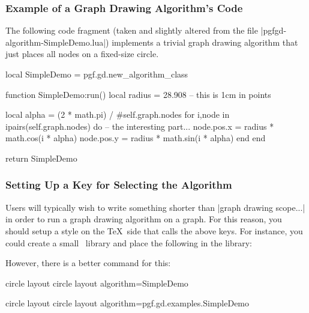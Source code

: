 \subsubsection{Example of a Graph Drawing Algorithm's Code}

The following code fragment (taken and slightly altered
from the file |pgfgd-algorithm-SimpleDemo.lua|)
implements a trivial graph drawing algorithm that just places all
nodes on a fixed-size circle.  



\begin{codeexample}
local SimpleDemo = pgf.gd.new_algorithm_class {}

function SimpleDemo:run()
  local radius = 28.908  -- this is 1cm in points

  local alpha = (2 * math.pi) / #self.graph.nodes
  for i,node in ipairs(self.graph.nodes) do
    -- the interesting part...
    node.pos.x = radius * math.cos(i * alpha)
    node.pos.y = radius * math.sin(i * alpha)
  end
end

return SimpleDemo
\end{codeexample}


\subsubsection{Setting Up a Key for Selecting the Algorithm}

Users will typically wish to write something shorter than
|graph drawing scope...| in order to run a graph drawing algorithm on
a graph. For this reason, you should setup a style on the \TeX\ side
that calls the above keys. For instance, you could create a small
\tikzname\ library and place the following in the library:

\begin{codeexample}
\end{codeexample}

However, there is a better command for this:

\begin{codeexample}[code only]
\pgfgddeclarealgorithmkey
{circle layout}
{circle layout}
{algorithm=SimpleDemo}
\end{codeexample}
\pgfgddeclarealgorithmkey
{circle layout}
{circle layout}
{algorithm=pgf.gd.examples.SimpleDemo}

